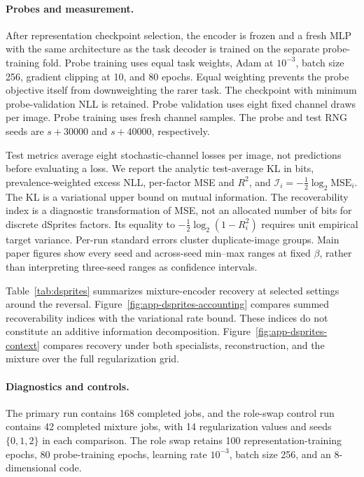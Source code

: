 \paragraph{Probes and measurement.}
After representation checkpoint selection, the encoder is frozen and a fresh
MLP with the same architecture as the task decoder is trained on the separate
probe-training fold. Probe training uses equal task weights, Adam at
$10^{-3}$, batch size 256, gradient clipping at 10, and 80 epochs. Equal
weighting prevents the probe objective itself from downweighting the rarer
task. The checkpoint with minimum probe-validation NLL is retained.
Probe validation uses eight fixed channel draws per image. Probe training
uses fresh channel samples. The probe and test RNG seeds are $s+30000$
and $s+40000$, respectively.

Test metrics average eight stochastic-channel losses per image, not predictions before evaluating a loss. We report the analytic test-average KL in bits, prevalence-weighted excess NLL, per-factor MSE and $R^2$, and
$\mathcal I_i=-\tfrac12\log_2\mathrm{MSE}_i$.
The KL is a variational upper bound on mutual information.
The recoverability index is a diagnostic transformation of MSE, not an
allocated number of bits for discrete dSprites factors. Its equality to
$-\tfrac12\log_2(1-R_i^2)$ requires unit empirical target variance.
Per-run standard errors cluster duplicate-image groups. Main paper figures
show every seed and across-seed min--max ranges at fixed $\beta$, rather
than interpreting three-seed ranges as confidence intervals.

Table~\ref{tab:dsprites} summarizes mixture-encoder recovery at selected
settings around the reversal.
Figure~\ref{fig:app-dsprites-accounting} compares summed recoverability
indices with the variational rate bound. These indices do not constitute
an additive information decomposition.
Figure~\ref{fig:app-dsprites-context} compares recovery under both
specialists, reconstruction, and the mixture over the full
regularization grid.

\paragraph{Diagnostics and controls.}
The primary run contains 168 completed jobs, and the role-swap control run contains 42 completed mixture jobs, with 14 regularization values and seeds $\{0,1,2\}$ in each comparison. The role swap retains 100 representation-training epochs, 80 probe-training epochs, learning rate $10^{-3}$, batch size 256, and an 8-dimensional code.


